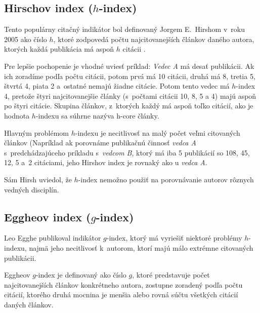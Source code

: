 \subsection{Hirschov index ($h$-index)}
\label{sec:h-index}

Tento populárny citačný indikátor bol definovaný Jorgem E.~Hirshom v~roku 2005
ako číslo $h$, ktoré zodpovedá počtu najcitovanejších článkov daného autora,
ktorých každá publikácia má aspoň $h$ citácii \citep{Hirsch2005}.

Pre lepšie pochopenie je vhodné uviesť príklad: \emph{Vedec A} má desať publikácii.
Ak ich zoradíme podľa počtu citácii, potom prvá má 10 citácii, druhá má 8,
tretia 5, štvrtá 4, piata 2 a~ostatné nemajú žiadne citácie.  Potom tento vedec
má $h$-index 4, pretože štyri najcitovanejšie články (s~počtami citácii 10, 8, 5
a 4) majú aspoň po štyri citácie.  Skupina článkov, z~ktorých každý má aspoň toľko
citácií, ako je hodnota $h$-indexu sa súhrne nazýva h-core články.

Hlavným problémom $h$-indexu je necitlivosť na malý počet veľmi citovaných
článkov (Napríklad ak porovnáme publikačnú činnosť \emph{vedca A}
s~predchádzajúceho príkladu s~\emph{vedcom B}, ktorý má iba 5 publikácií so 108,
45, 12, 5 a~2 citáciami, jeho Hirshov index je rovnaký ako u \emph{vedca A}.

Sám Hirsh uviedol, že $h$-index nemožno použiť na porovnávanie autorov rôznych
vedných disciplín.


\subsection{Eggheov index ($g$-index)}
\label{sec:g-index}

Leo Egghe \citeyearpar{Egghe2006} publikoval indikátor $g$-index, ktorý má
vyriešiť niektoré problémy $h$-indexu, najmä jeho necitlivosť k~autorom, ktorí
majú málo extrémne citovaných publikácii.

Eggheov $g$-index je definovaný ako číslo $g$, ktoré predstavuje počet
najcitovanejších článkov konkrétneho autora, zostupne zoradený podľa počtu
citácií, ktorého druhá mocnina je menšia alebo rovná súčtu všetkých citácií
daných článkov.

